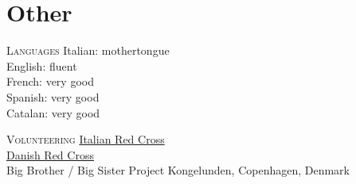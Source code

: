 \section*{Other}

\begin{paracol}{2}
  \textsc{Languages}
\switchcolumn
  Italian: mothertongue\\
  English: fluent\\
  French: very good\\
  Spanish: very good\\
  Catalan: very good
\end{paracol}

\begin{paracol}{2}
  \textsc{Volunteering}
\switchcolumn
  \href{https://www.cri.it}{Italian Red Cross}\\
  \href{https://www.rodekors.dk/}{Danish Red Cross}\\
  Big Brother / Big Sister Project Kongelunden, Copenhagen, Denmark
\end{paracol}